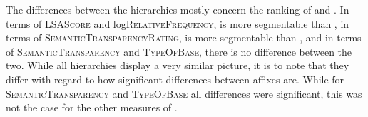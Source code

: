 \begin{table}
	\caption{Segmentability hierarchies for each decomposability measure}
	\label{tbl:summary comparison of affix}
	
\end{table}



The differences  between the hierarchies mostly concern the ranking of  and . In terms of \textsc{LSAScore} and log\textsc{RelativeFrequency},  is more segmentable than , in terms of \textsc{SemanticTransparencyRating},  is more segmentable than , and in terms of \textsc{SemanticTransparency} and \textsc{TypeOfBase}, there is no difference between the two. 
While all hierarchies display a very similar picture, it is to note that they differ with regard to how significant differences between affixes are. While for \textsc{SemanticTransparency} and \textsc{TypeOfBase} all differences were significant, this was not the case for the other measures of . 


